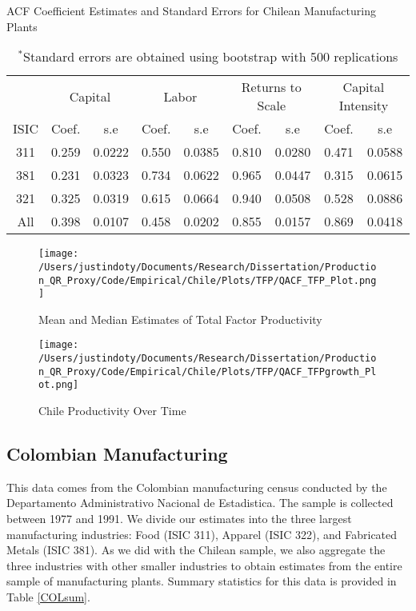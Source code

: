 \documentclass[11pt]{article}
\begin{document}
\begin{table}[H]
\centering
\caption{ACF Coefficient Estimates and Standard Errors for Chilean Manufacturing Plants}
\begin{tabular}{ccccccccc}
  \hline\hline & \multicolumn{2}{c}{Capital} & \multicolumn{2}{c}{Labor} & \multicolumn{2}{c}{Returns to Scale} & \multicolumn{2}{c}{Capital Intensity}\\ \cmidrule(lr){2-3} \cmidrule(lr){4-5} \cmidrule(lr){6-7} \cmidrule(lr){8-9}ISIC & Coef. & s.e & Coef. & s.e & Coef. & s.e & Coef. & s.e \\ 
  \hline
311 & 0.259 & 0.0222 & 0.550 & 0.0385 & 0.810 & 0.0280 & 0.471 & 0.0588 \\ 
  381 & 0.231 & 0.0323 & 0.734 & 0.0622 & 0.965 & 0.0447 & 0.315 & 0.0615 \\ 
  321 & 0.325 & 0.0319 & 0.615 & 0.0664 & 0.940 & 0.0508 & 0.528 & 0.0886 \\ 
  All & 0.398 & 0.0107 & 0.458 & 0.0202 & 0.855 & 0.0157 & 0.869 & 0.0418 \\ 
   \hline
\end{tabular}
\caption*{\footnotesize $^{*}$Standard errors are obtained using bootstrap with 500 replications}
\label{CHLACFCoef}
\end{table}

\begin{figure}[H]
\centering
\caption{Mean and Median Estimates of Total Factor Productivity}
\texttt{[image: /Users/justindoty/Documents/Research/Dissertation/Production\_QR\_Proxy/Code/Empirical/Chile/Plots/TFP/QACF\_TFP\_Plot.png]}
\label{fig:ACFCHLTFPDens}
\end{figure}

\begin{figure}[H]
\centering
\caption{Chile Productivity Over Time}
\texttt{[image: /Users/justindoty/Documents/Research/Dissertation/Production\_QR\_Proxy/Code/Empirical/Chile/Plots/TFP/QACF\_TFPgrowth\_Plot.png]}
\label{fig:ACFCHLpgrowth}
\end{figure}




\subsection{Colombian Manufacturing}
This data comes from the Colombian manufacturing census conducted by the Departamento Administrativo Nacional de Estadistica. The sample is collected between 1977 and 1991. We divide our estimates into the three largest manufacturing industries: Food (ISIC 311), Apparel (ISIC 322), and Fabricated Metals (ISIC 381). As we did with the Chilean sample, we also aggregate the three industries with other smaller industries to obtain estimates from the entire sample of manufacturing plants. Summary statistics for this data is provided in Table \ref{COLsum}.
\end{document}
